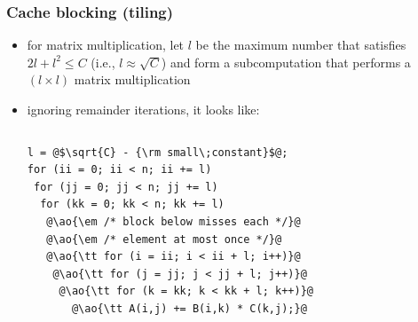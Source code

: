 \documentclass[12pt,dvipdfmx]{beamer}
\newcommand{\ao}[1]{{\color{blue}#1}}
\newcommand{\aka}[1]{{\color{red}#1}}
\begin{document}


\begin{frame}[fragile]
\frametitle{Cache blocking (tiling)}

\begin{itemize}
\item for matrix multiplication, let $l$ be the maximum number
that satisfies $2l + l^2\leq C$ (i.e., \ao{$l \approx \sqrt{C}$}) and form
a subcomputation that performs a $(l \times l)$ matrix multiplication

\item ignoring remainder iterations, it looks like:
\begin{columns}
\begin{column}{0.5\textwidth}
\begin{lstlisting}
l = @$\sqrt{C} - {\rm small\;constant}$@;
for (ii = 0; ii < n; ii += l)
 for (jj = 0; jj < n; jj += l)
  for (kk = 0; kk < n; kk += l)
   @\ao{\em /* block below misses each */}@
   @\ao{\em /* element at most once */}@
   @\ao{\tt for (i = ii; i < ii + l; i++)}@
    @\ao{\tt for (j = jj; j < jj + l; j++)}@
     @\ao{\tt for (k = kk; k < kk + l; k++)}@
       @\ao{\tt A(i,j) += B(i,k) * C(k,j);}@
\end{lstlisting}
\end{column}
\begin{column}{0.5\textwidth}
\def\svgwidth{1.0\textwidth}
{\tiny}
\end{column}
\end{columns}
\end{itemize}
\end{frame}
\end{document}
